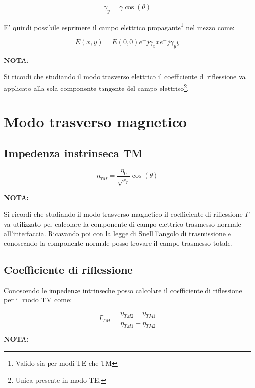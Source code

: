\documentclass[10pt,a4paper]{report}
\begin{document}
			\begin{equation}
			\gamma_y=\gamma\cos(\theta)
			\end{equation}

			E' quindi possibile esprimere il campo elettrico propagante\footnote{Valido sia per modi TE che TM} nel mezzo come:
			
			\begin{equation}
			E(x,y)=E(0,0)e^-{j\gamma_x x}e^-{j\gamma_y y}
			\end{equation}
		
			\textbf{NOTA:}

			Si ricordi che studiando il modo trasverso elettrico il coefficiente di riflessione va applicato alla sola componente tangente del campo elettrico\footnote{Unica presente in modo TE.}.
			
	\section{Modo trasverso magnetico}

			\subsection{Impedenza instrinseca TM}

				\begin{equation}
					\eta_{TM}=\frac{\eta_0}{\sqrt{\epsilon_r}}\cos(\theta)
				\end{equation}

			\textbf{NOTA:}

			Si ricordi che studiando il modo trasverso magnetico il coefficiente di riflessione $\Gamma$ va utilizzato per calcolare la componente di campo elettrico trasmesso normale all'interfaccia.
			Ricavando poi con la legge di Snell l'angolo di trasmissione e conoscendo la componente normale posso trovare il campo trasmesso totale.

		\subsection{Coefficiente di riflessione}
			Conoscendo le impedenze intrinseche posso calcolare il coefficiente di riflessione per il modo TM come:

			\begin{equation}
			\Gamma_{TM}=\frac{\eta_{TM2}-\eta_{TM1}}{\eta_{TM1}+\eta_{TM2}}
			\end{equation}
		
			 
			 \textbf{ NOTA: }
			 
\end{document}
